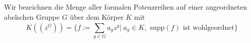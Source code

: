 %
%
%
%
%
%
Wir bezeichnen die Menge aller formalen Potenzreihen auf einer angeordneten abelschen Gruppe $G$ über dem Körper $K$ mit 
\[K\left(\left(z^{G}\right)\right) = \lbrace f := \sum_{g \in G}^{}a_g z^g |~ a_g \in K, \text{  supp}(f) \text{ ist wohlgeordnet}\rbrace\]
%
%
